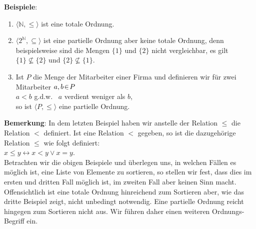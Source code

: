 \noindent
\textbf{Beispiele}:
\begin{enumerate}
\item $\langle\mathbb{N}, \leq \rangle$ ist eine totale Ordnung.
\item $\langle 2^{\mathbb{N}}, \subseteq \rangle$ ist eine partielle Ordnung aber keine totale Ordnung, denn beispielsweise sind die Mengen
      $\{1\}$ und $\{2\}$ nicht vergleichbar, es gilt \\[0.2cm]
      \hspace*{1.3cm} $\{1\} \not\subseteq \{2\}$ und $\{2\} \not\subseteq \{1\}$.
\item Ist $P$ die Menge der Mitarbeiter einer Firma und definieren wir f\"ur zwei
      Mitarbeiter $a,b \!\in\! P$\\[0.2cm]
      \hspace*{1.3cm} $a < b$ \quad g.d.w.~ \quad  $a$ verdient weniger als $b$, \\[0.2cm]
      so ist $\langle P, \leq \rangle$ eine partielle Ordnung.
\end{enumerate}
\textbf{Bemerkung}: In dem letzten Beispiel haben wir anstelle der Relation $\leq$ die
Relation $<$ definiert.  Ist eine Relation $<$ gegeben, so ist die dazugeh\"orige Relation
$\leq$ wie folgt definiert: \\[0.2cm]
\hspace*{1.3cm} $x \leq y \leftrightarrow x < y \vee x = y$. \\[0.2cm]
Betrachten wir die obigen Beispiele und \"uberlegen uns, in welchen F\"allen es m\"oglich ist,
eine Liste von Elemente zu sortieren, so stellen wir fest, dass dies im ersten und dritten Fall m\"oglich
ist, im zweiten Fall aber keinen Sinn macht.  Offensichtlich ist eine
totale Ordnung hinreichend zum Sortieren aber, wie das dritte Beispiel zeigt, nicht
unbedingt notwendig.  Eine partielle Ordnung reicht hingegen zum Sortieren nicht aus.
Wir f\"uhren daher einen weiteren Ordnungs-Begriff ein.
\pagebreak

